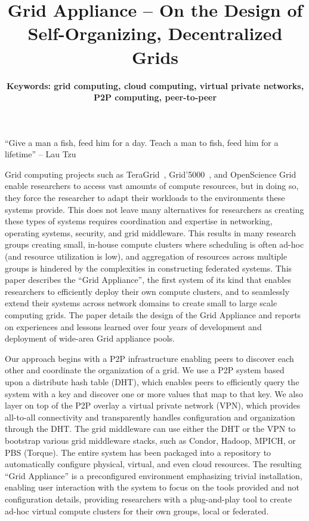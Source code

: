 \documentclass[workingdraft,endnotes]{usetex-v1}
\begin{document}
\title{Grid Appliance -- On the Design of Self-Organizing,
Decentralized Grids}


\author{
\small{\bf Keywords: grid computing, cloud computing, virtual private networks,
P2P computing, peer-to-peer}
}

\maketitle


``Give a man a fish, feed him for a day.  Teach a man to fish, feed him for a
lifetime'' -- Lau Tzu

Grid computing projects such as TeraGrid~\cite{teragrid},
Grid'5000~\cite{grid_5000}, and OpenScience Grid~\cite{osg} enable researchers
to access vast amounts of compute resources, but in doing so, they force the
researcher to adapt their workloads to the environments these systems provide.
This does not leave many alternatives for researchers as creating these types
of systems requires coordination and expertise in networking, operating
systems, security, and grid middleware.  This results in many research groups
creating small, in-house compute clusters where scheduling is often ad-hoc (and
resource utilization is low), and aggregation of resources across multiple
groups is hindered by the complexities in constructing federated systems.  This
paper describes the ``Grid Appliance'', the first system of its kind that
enables researchers to efficiently deploy their own compute clusters, and to
seamlessly extend their systems across network domains to create small to large
scale computing grids.  The paper details the design of the Grid Appliance and
reports on experiences and lessons learned over four years of development and
deployment of wide-area Grid appliance pools.

Our approach begins with a P2P infrastructure enabling peers to discover each
other and coordinate the organization of a grid.  We use a P2P system based
upon a distribute hash table (DHT), which enables peers to efficiently query
the system with a key and discover one or more values that map to that key.  We
also layer on top of the P2P overlay a virtual private network (VPN), which
provides all-to-all connectivity and transparently handles configuration and
organization through the DHT.  The grid middleware can use either the DHT or
the VPN to bootstrap various grid middleware stacks, such as Condor, Hadoop,
MPICH, or PBS (Torque).  The entire system has been packaged into a repository
to automatically configure physical, virtual, and even cloud resources.  The
resulting ``Grid Appliance'' is a preconfigured environment emphasizing trivial
installation, enabling user interaction with the system to focus on the tools
provided and not configuration details, providing researchers with a
plug-and-play tool to create ad-hoc virtual compute clusters for their own
groups, local or federated.
\end{document}
